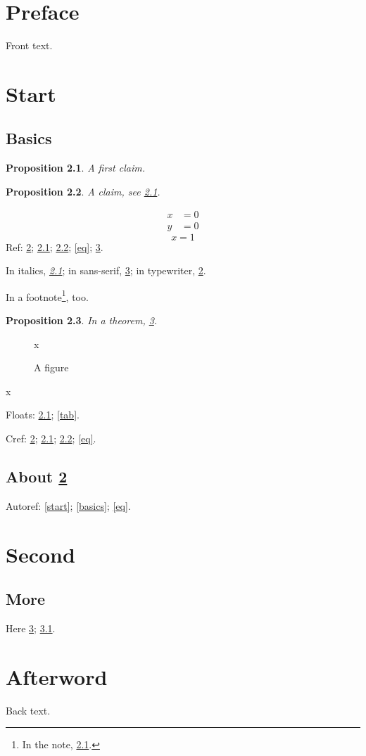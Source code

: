 \documentclass{book}
\newtheorem{proposition}{Proposition}[chapter]
\begin{document}
\frontmatter
\chapter{Preface}\label{preface}
Front text.
\tableofcontents
\mainmatter
\chapter{Start}\label{start}
\section{Basics}\label{basics}
\begin{proposition}
A first claim.
\end{proposition}
\begin{proposition}\label{prop}
A claim, see \ref{basics}.
\end{proposition}
\begin{align}
x &= 0 \\
y &= 0
\end{align}
\begin{equation}
x = 1 \label{eq}
\end{equation}
Ref: \ref{start}; \ref{basics}; \ref{prop}; \eqref{eq}; \ref{second}.

In italics, \textit{\ref{basics}}; in sans-serif, \textsf{\ref{second}}; in typewriter, \texttt{\ref{start}}.

In a footnote\footnote{In the note, \ref{basics}.}, too.
\begin{proposition}
In a theorem, \ref{second}.
\end{proposition}
\begin{figure}
x
\caption{A figure}\label{fig}
\end{figure}
\begin{table}
x
\caption{A table}\label{tab}
\end{table}
Floats: \ref{fig}; \ref{tab}.

Cref: \cref{start}; \cref{basics}; \cref{prop}; \cref{eq}.
\section{About \ref{start}}
Autoref: \autoref{start}; \autoref{basics}; \autoref{eq}.
\chapter{Second}\label{second}
\section{More}\label{more}
Here \ref{second}; \ref{more}.
\backmatter
\chapter{Afterword}\label{afterword}
Back text.
\end{document}
